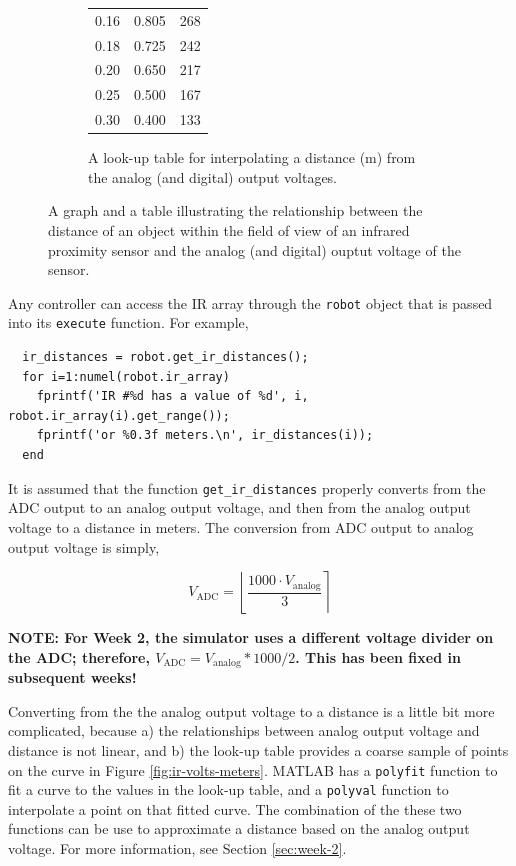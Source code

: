 \documentclass[10pt]{article}
\begin{document}
\begin{figure}[t]
\begin{subfigure}{0.45\textwidth}
\begin{center}
\begin{tabular}{|p{}|p{}|p{}|}
       0.16 & 0.805 & 268 \\
       0.18 & 0.725 & 242 \\
       0.20 & 0.650 & 217 \\
       0.25 & 0.500 & 167 \\
       0.30 & 0.400 & 133 \\
       \hline
    \end{tabular}
  \end{center}
    \caption{A look-up table for interpolating a distance (m) from the analog (and digital) output voltages.}
    \label{fig:ir-adc}
  \end{subfigure}
  \caption{A graph and a table illustrating the relationship between the distance of an object within the field of view of an infrared proximity sensor and the analog (and digital) ouptut voltage of the sensor.}
  \label{fig:quickbot}
\end{figure}

Any controller can access the IR array through the \texttt{robot} object that is passed into its \texttt{execute} function. For example,
\begin{verbatim}
  ir_distances = robot.get_ir_distances();
  for i=1:numel(robot.ir_array)
    fprintf('IR #%d has a value of %d', i, robot.ir_array(i).get_range());
    fprintf('or %0.3f meters.\n', ir_distances(i));
  end
\end{verbatim}

It is assumed that the function \texttt{get\_ir\_distances} properly converts from the ADC output to an analog output voltage, and then from the analog output voltage to a distance in meters. The conversion from ADC output to analog output voltage is simply,

\begin{equation*}
  V_{\text{ADC}} = \left\lfloor\frac{1000\cdot V_{\text{analog}}}{3}\right\rceil
\end{equation*}

\textbf{NOTE: For Week 2, the simulator uses a different voltage divider on the ADC; therefore, $V_{\text{ADC}}= V_{\text{analog}}*1000/2$. This has been fixed in subsequent weeks!}

Converting from the the analog output voltage to a distance is a little bit more complicated, because a) the relationships between analog output voltage and distance is not linear, and b) the look-up table provides a coarse sample of points on the curve in Figure \ref{fig:ir-volts-meters}. MATLAB has a \texttt{polyfit} function to fit a curve to the values in the look-up table, and a \texttt{polyval} function to interpolate a point on that fitted curve. The combination of the these two functions can be use to approximate a distance based on the analog output voltage. For more information, see Section \ref{sec:week-2}.
\end{document}
